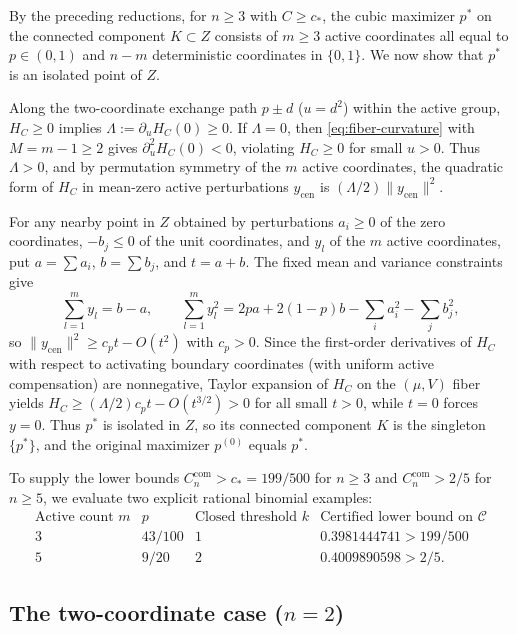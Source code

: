 By the preceding reductions, for $n\ge3$ with $C\ge c_*$, the cubic maximizer
$p^*$ on the connected component $K\subset Z$ consists of $m\ge3$ active
coordinates all equal to $p\in(0,1)$ and $n-m$ deterministic coordinates in
$\{0,1\}$. We now show that $p^*$ is an isolated point of $Z$.

Along the two-coordinate exchange path $p\pm d$ ($u=d^2$) within the active
group, $H_C\ge0$ implies $\Lambda:=\partial_uH_C(0)\ge0$. If $\Lambda=0$,
then \eqref{eq:fiber-curvature} with $M=m-1\ge2$ gives
$\partial_u^2H_C(0)<0$, violating $H_C\ge0$ for small $u>0$. Thus
$\Lambda>0$, and by permutation symmetry of the $m$ active coordinates, the
quadratic form of $H_C$ in mean-zero active perturbations $y_{\mathrm{cen}}$
is $(\Lambda/2)\|y_{\mathrm{cen}}\|^2$.

For any nearby point in $Z$ obtained by perturbations $a_i\ge0$ of the
zero coordinates, $-b_j\le0$ of the unit coordinates, and $y_l$ of the $m$
active coordinates, put $a=\sum a_i$, $b=\sum b_j$, and $t=a+b$. The fixed
mean and variance constraints give
\[
 \sum_{l=1}^m y_l=b-a,\qquad
 \sum_{l=1}^m y_l^2=2pa+2(1-p)b-\sum_i a_i^2-\sum_j b_j^2,
\]
so $\|y_{\mathrm{cen}}\|^2\ge c_pt-O(t^2)$ with $c_p>0$. Since the first-order
derivatives of $H_C$ with respect to activating boundary coordinates (with
uniform active compensation) are nonnegative, Taylor expansion of $H_C$ on the
$(\mu,V)$ fiber yields $H_C\ge(\Lambda/2)c_pt-O(t^{3/2})>0$ for all small
$t>0$, while $t=0$ forces $y=0$. Thus $p^*$ is isolated in $Z$, so its
connected component $K$ is the singleton $\{p^*\}$, and the original maximizer
$p^{(0)}$ equals $p^*$.

To supply the lower bounds $C_n^{\mathrm{com}}>c_*=199/500$ for $n\ge3$ and
$C_n^{\mathrm{com}}>2/5$ for $n\ge5$, we evaluate two explicit rational
binomial examples:
\[
 \begin{array}{c|c|c|c}
 \text{Active count }m&p&\text{Closed threshold }k&\text{Certified lower bound on }\mathcal C\\\hline
 3&43/100&1&0.3981444741>199/500\\
 5&9/20&2&0.4009890598>2/5.
 \end{array}
\]

\subsection{The two-coordinate case ($n=2$)}

